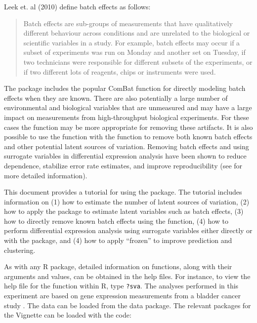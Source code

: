 \documentclass[12pt]{article}
\begin{document}
Leek et. al (2010) define batch effects as follows: 
\begin{quote}
Batch effects are sub-groups of measurements that have qualitatively different behaviour across conditions and are unrelated to the biological or scientific variables in a study. For example, batch effects may occur if a subset of experiments was run on Monday and another set on Tuesday, if two technicians were responsible for different subsets of the experiments, or if two different lots of reagents, chips or instruments were used.
\end{quote}
The  package includes the popular ComBat \cite{johnson:2007aa} function for directly modeling batch effects when they are known. There are also potentially a large number of environmental and biological variables that are unmeasured and may have a large impact on measurements from high-throughput biological experiments. For these cases the  function may be more appropriate for removing these artifacts. It is also possible to use the  function with the  function to remove both known batch effects and other potential latent sources of variation. Removing batch effects and using surrogate variables in differential expression analysis have been shown to reduce dependence, stabilize error rate estimates, and improve reproducibility (see \cite{leek:storey:2007,leek:storey:2008,leek:2010aa} for more detailed information).

This document provides a tutorial for using the  package. The tutorial includes information on (1) how to estimate the number of latent sources of variation, (2) how to apply the package to estimate latent variables such as batch effects, (3) how to directly remove known batch effects using the  function, (4) how to perform differential expression analysis using surrogate variables either directly or with the package, and (4) how to apply ``frozen''  to improve prediction and clustering.  

As with any R package, detailed information on functions, along with their arguments and values, can be obtained in the help files. For instance, to view the help file for the function  within R, type \texttt{?sva}.  The analyses performed in this experiment are based on gene expression measurements from a bladder cancer study \cite{dyrskjot:2004aa}. The data can be loaded from the  data package. The relevant packages for the Vignette can be loaded with the code:
\end{document}
